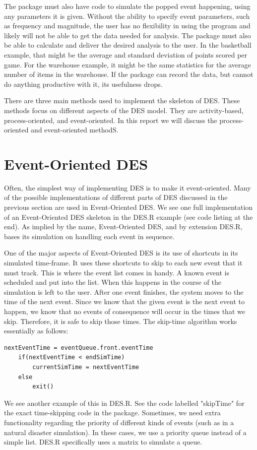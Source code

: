 \documentclass[a4paper, 11pt]{article} %
\begin{document}
The package must also have code to simulate the popped event happening, using any parameters it is given. Without the ability to specify event parameters, such as frequency and magnitude, the user has no flexibility in using the program and likely will not be able to get the data needed for analysis. The package must also be able to calculate and deliver the desired analysis to the user. In the basketball example, that might be the average and standard deviation of points scored per game. For the warehouse example, it might be the same statistics for the average number of items in the warehouse. If the package can record the data, but cannot do anything productive with it, its usefulness drops.


There are three main methods used to implement the skeleton of DES. These methods focus on different aspects of the DES model. They are activity-based, process-oriented, and event-oriented. In this report we will discuss the process-oriented and event-oriented methodS.



\section*{Event-Oriented DES}

Often, the simplest way of implementing DES is to make it event-oriented. Many of the possible implementations of different parts of DES discussed in the previous section are used in Event-Oriented DES. We see one full implementation of an Event-Oriented DES skeleton in the DES.R example (see code listing at the end). As implied by the name, Event-Oriented DES, and by extension DES.R, bases its simulation on handling each event in sequence. 

One of the major aspects of Event-Oriented DES is its use of shortcuts in its simulated time-frame. It uses these shortcuts to skip to each new event that it must track. This is where the event list comes in handy. A known event is scheduled and put into the list. When this happens in the course of the simulation is left to the user. After one event finishes, the system moves to the time of the next event. Since we know that the given event is the next event to happen, we know that no events of consequence will occur in the times that we skip. Therefore, it is safe to skip those times. The skip-time algorithm works essentially as follows: \pagebreak

\begin{lstlisting}[caption=Skip Time Algorithm]
	nextEventTime = eventQueue.front.eventTime
	if(nextEventTime < endSimTime)
		currentSimTime = nextEventTime
	else
		exit()
\end{lstlisting}
We see another example of this in DES.R. See the code labelled "skipTime" for the exact time-skipping code in the package. Sometimes, we need extra functionality regarding the priority of different kinds of events (such as in a natural disaster simulation). In these cases, we use a priority queue instead of a simple list. DES.R specifically uses a matrix to simulate a queue.
\end{document}
